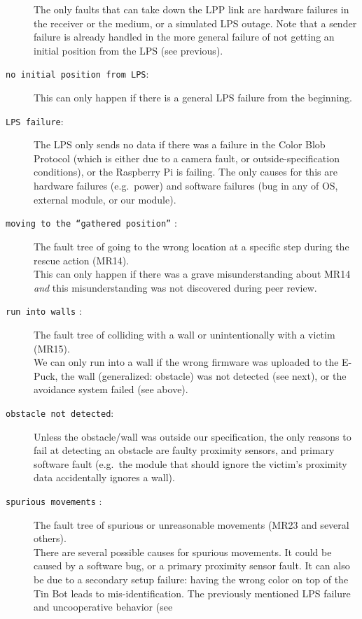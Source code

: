 \documentclass[a4paper,parskip,headheight=38pt]{scrartcl} %
\begin{document}
\begin{description}
    The only faults that can take down the LPP link are hardware
    failures in the receiver or the medium, or a simulated LPS outage.
    Note that a sender failure is already handled in the more general
    failure of not getting an initial position from the LPS (see
    previous).
\item[\texttt{no initial position from LPS}:]
    This can only happen if there is a general LPS failure from the beginning.
\item[\texttt{LPS failure}:]
    The LPS only sends no data if there was a failure in the Color Blob
    Protocol (which is either due to a camera fault, or
    outside-specification conditions), or the Raspberry Pi is failing.
    The only causes for this are hardware failures (e.g.\ power)
    and software failures (bug in any of OS, external module, or
    our module).
\item[\texttt{moving to the \enquote{gathered position}} \refpdf{gowrong}:]
    The fault tree of going to the wrong location at a specific step
    during the rescue action (MR14).
     \\
    This can only happen if there was a grave misunderstanding about
    MR14 \emph{and} this misunderstanding was not discovered during
    peer review.
\item[\texttt{run into walls} \refpdf{runintowall}:]
    The fault tree of colliding with a wall or unintentionally with a
    victim (MR15).
     \\
    We can only run into a wall if the wrong firmware was uploaded to
    the E-Puck, the wall (generalized: obstacle) was not detected (see
    next), or the avoidance system failed (see above).
\item[\texttt{obstacle not detected}:]
    Unless the obstacle/wall was outside our specification, the only
    reasons to fail at detecting an obstacle are faulty proximity
    sensors, and primary software fault (e.g.\ the module that should
    ignore the victim's proximity data accidentally ignores a wall).
\item[\texttt{spurious movements} \refpdf{spuriousmovements}:]
    The fault tree of spurious or unreasonable movements (MR23 and
    several others).
     \\
    There are several possible causes for spurious movements.  It could
    be caused by a software bug, or a primary proximity sensor fault.
    It can also be due to a secondary setup failure: having the wrong
    color on top of the Tin Bot leads to mis-identification.  The
    previously mentioned LPS failure and uncooperative behavior (see

\end{description}
\end{document}
